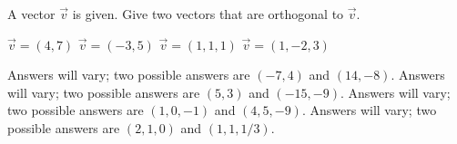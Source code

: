 
\begin{Exercise}[
name={},
title={}, 
difficulty=0,
origin={\cite{GHC}}]
A vector $\vec v$ is given. Give two vectors that are orthogonal to $\vec v$.
\begin{multicols}{2}
\Question $\vec v = (4,7)$
\Question $\vec v = (-3,5)$
\Question $\vec v = (1,1,1)$
\Question $\vec v = (1,-2,3)$
\EndCurrentQuestion
\end{multicols}
\end{Exercise}

\begin{Answer}
\Question Answers will vary; two possible answers are $(-7,4)$ and $(14,-8)$.
\Question Answers will vary; two possible answers are $(5,3)$ and $(-15,-9)$.
\Question Answers will vary; two possible answers are $(1,0,-1)$ and $(4,5,-9)$.
\Question Answers will vary; two possible answers are $(2,1,0)$ and $(1,1,1/3)$.
\end{Answer}

